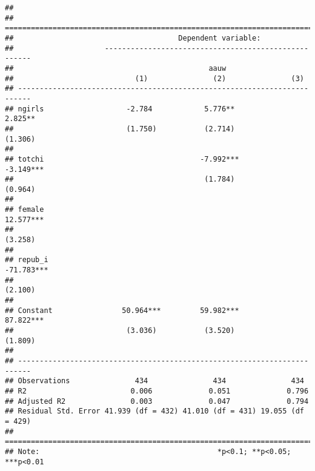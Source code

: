 \documentclass[
]{article}
\begin{document}
\begin{verbatim}
## 
## =========================================================================
##                                      Dependent variable:                 
##                     -----------------------------------------------------
##                                             aauw                         
##                            (1)               (2)               (3)       
## -------------------------------------------------------------------------
## ngirls                   -2.784            5.776**           2.825**     
##                          (1.750)           (2.714)           (1.306)     
##                                                                          
## totchi                                    -7.992***         -3.149***    
##                                            (1.784)           (0.964)     
##                                                                          
## female                                                      12.577***    
##                                                              (3.258)     
##                                                                          
## repub_i                                                    -71.783***    
##                                                              (2.100)     
##                                                                          
## Constant                50.964***         59.982***         87.822***    
##                          (3.036)           (3.520)           (1.809)     
##                                                                          
## -------------------------------------------------------------------------
## Observations               434               434               434       
## R2                        0.006             0.051             0.796      
## Adjusted R2               0.003             0.047             0.794      
## Residual Std. Error 41.939 (df = 432) 41.010 (df = 431) 19.055 (df = 429)
## =========================================================================
## Note:                                         *p<0.1; **p<0.05; ***p<0.01
\end{verbatim}
\end{document}
